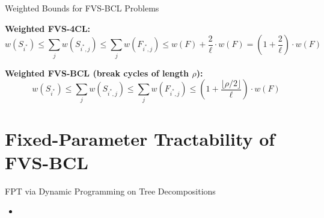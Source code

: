 \documentclass{beamer}
\begin{document}
\begin{frame}{Weighted Bounds for FVS-BCL Problems}

\textbf{Weighted FVS-4CL:}
\[
w(S_{i^*}) \leq \sum\limits_j w(S_{i^*, j}) \leq \sum\limits_j w(F_{i^*, j}) \leq w(F) + \frac{2}{\ell} \cdot w(F) = \left(1 + \frac{2}{\ell}\right) \cdot w(F)
\]

\vspace{1em}

\textbf{Weighted FVS-BCL (break cycles of length $\rho$):}
\[
w(S_{i^*}) \leq \sum\limits_j w(S_{i^*, j}) \leq \sum\limits_j w(F_{i^*, j}) \leq \left(1 + \frac{\lfloor\rho/2\rfloor}{\ell}\right) \cdot w(F)
\]

\end{frame}


\section{Fixed-Parameter Tractability of FVS-BCL}

\begin{frame}{FPT via Dynamic Programming on Tree Decompositions}
  \begin{itemize}
    \item 
  \end{itemize}
\end{frame}
\end{document}
